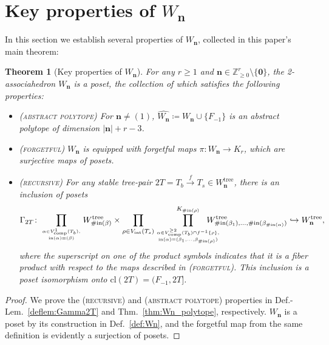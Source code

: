 \documentclass[11pt]{amsart}
\newtheorem{theorem}{Theorem}[section]
\theoremstyle{definition}
\theoremstyle{remark}
\theoremstyle{plain}
\newcommand{\bZ}{\mathbb{Z}}
\newcommand\bn{\mathbf{n}}
\newcommand\bzero{\mathbf{0}}
\newcommand{\on}{\operatorname}
\newcommand{\comp}{C^2}
\renewcommand{\comp}{{\on{comp}}}
\newcommand{\incom}{\on{in}}
\newcommand{\inte}{{\on{int}}}
\newcommand{\tree}{{\on{tree}}}
\newcommand{\cl}{\mathrm{cl}}
\newcommand{\sr}{\stackrel}
\newcommand{\wh}{\widehat}
\def\hra{\hookrightarrow}
\begin{document}
\section{Key properties of \texorpdfstring{$W_\bn$}{Wn}}
\label{sec:Wn_polytope}


In this section we establish several properties of $W_\bn$, collected in this paper's main theorem:

\begin{theorem}[Key properties of $W_\bn$]
\label{thm:main}
For any $r \geq 1$ and $\bn \in \bZ^r_{\geq0}\setminus\{\bzero\}$, the 2-associahedron $W_\bn$ is a poset, the collection of which satisfies the following properties:
\begin{itemize}
\item[] \textsc{(abstract polytope)} For $\bn \neq (1)$, $\wh{W_\bn} \coloneqq W_\bn \cup \{F_{-1}\}$ is an abstract polytope of dimension $|\bn| + r - 3$.

\item[] \textsc{(forgetful)} $W_\bn$ is equipped with forgetful maps $\pi\colon W_\bn \to K_r$, which are surjective maps of posets.

\item[] \textsc{(recursive)} For any stable tree-pair $2T = T_b \sr{f}{\to} T_s \in W_\bn^\tree$, there is an inclusion of posets
\begin{align}
\Gamma_{2T} \colon \prod_{
{\alpha \in V_\comp^1(T_b),}
\atop
{\incom(\alpha)=(\beta)}
} W_{\#\!\incom(\beta)}^\tree
\times
\prod_{\rho \in V_\inte(T_s)} \prod^{K_{\#\!\incom(\rho)}}_{
{\alpha\in V_\comp^{\geq2}(T_b)\cap f^{-1}\{\rho\},}
\atop
{\incom(\alpha)=(\beta_1,\ldots,\beta_{\#\!\incom(\rho)})}
}
\hspace{-0.25in} W^\tree_{\#\!\incom(\beta_1),\ldots,\#\!\incom(\beta_{\#\!\incom(\alpha)})}
\hra W_\bn^\tree,
\end{align}
where the superscript on one of the product symbols indicates that it is a fiber product with respect to the maps described in \textsc{(forgetful)}.
This inclusion is a poset isomorphism onto $\cl(2T) = (F_{-1},2T]$.
\end{itemize}
\end{theorem}

\begin{proof}
We prove the \textsc{(recursive)} and \textsc{(abstract polytope)} properties in Def.-Lem.~\ref{deflem:Gamma2T} and Thm.~\ref{thm:Wn_polytope}, respectively.
$W_\bn$ is a poset by its construction in Def.~\ref{def:Wn}, and the forgetful map from the same definition is evidently a surjection of posets.
\end{proof}
\end{document}
